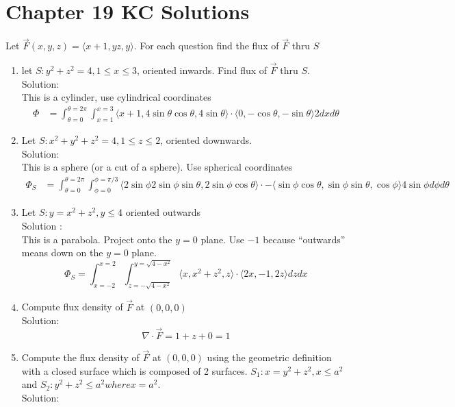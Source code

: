 \documentclass[11pt]{article}
\begin{document}
      \section{Chapter 19 KC Solutions}
      Let $\vec{F}(x,y,z) = \langle x+1, yz, y \rangle$.
              For each question find the flux of $\vec{F}$ thru $S$
      \begin{enumerate}
        \item let $S : y^{2} + z^{2} = 4, 1 \le x \le 3$, oriented inwards. Find flux of $\vec{F}$ thru $S$. \\
              Solution: \\
              This is a cylinder, use cylindrical coordinates
              \begin{align*}
                \Phi
                &= \int_{\theta= 0}^{\theta = 2\pi}\int_{x=1}^{x=3} \langle x + 1, 4\sin\theta\cos\theta, 4\sin\theta \rangle \cdot \langle  0 , -\cos\theta, -\sin\theta \rangle 2 dx d\theta
              \end{align*}
        \item Let $S : x^{2}+y^{2}+z^{2} = 4, 1 \le z \le 2$, oriented downwards.\\
              Solution: \\
              This is a sphere (or a cut of a sphere). Use spherical coordinates
              \begin{align*}
                \Phi_{S}
                &= \int_{\theta = 0}^{\theta = 2\pi} \int_{\phi = 0}^{\phi = \pi/3 } \langle 2\sin\phi 2\sin\phi\sin\theta, 2\sin\phi\cos\theta \rangle \cdot -\langle \sin\phi\cos\theta, \sin\phi\sin\theta, \cos\phi\rangle 4\sin\phi  d\phi d\theta
              \end{align*}
        \item Let $S : y =  x^{2} + z^{2}, y \le 4$ oriented outwards \\
              Solution : \\
              This is a parabola. Project onto the $y=0$ plane. Use $-1$ because ``outwards'' means down on the $y=0$ plane.
              \[\Phi_{S} = \int_{x=-2}^{x=2} \int_{z=-\sqrt{4-x^{2}}}^{y=\sqrt{4-x^{2}}} \langle x, x^{2} + z^{2}, z \rangle \cdot \langle 2x, -1, 2z \rangle dzdx\]
        \item Compute flux density of $\vec{F}$ at $(0,0,0)$\\
              Solution: \\
              \[\nabla \cdot \vec{F} = 1 + z + 0  = 1\]
        \item Compute the flux density of $\vec{F}$ at $(0,0,0)$ using the geometric definition with a closed surface which is composed of 2 surfaces.
              $S_{1} : x = y^{2} + z^{2}, x \le a^{2}$ and $S_{2} : y^{2} + z^{2} \le a^{2} where x=a^{2}$. \\
              Solution: \\


\end{enumerate}
\end{document}
